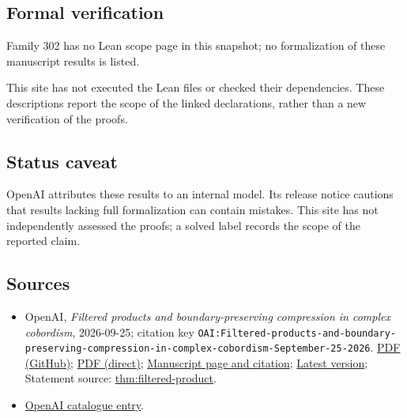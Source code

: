 \documentclass[11pt]{article}
\begin{document}
\subsection{Formal verification}
Family 302 has no Lean scope page in this snapshot; no formalization of these manuscript results is listed.

This site has not executed the Lean files or checked their dependencies. These descriptions report the scope of the linked declarations, rather than a new verification of the proofs.

\subsection{Status caveat}
OpenAI attributes these results to an internal model. Its release notice cautions that results lacking full formalization can contain mistakes. This site has not independently assessed the proofs; a solved label records the scope of the reported claim.

\subsection{Sources}
\begin{itemize}
\item OpenAI, \emph{Filtered products and boundary-preserving compression in complex cobordism}, 2026-09-25; citation key \texttt{OAI:Filtered-products-and-boundary-preserving-compression-in-complex-cobordism-September-25-2026}. \href{https://github.com/openai/math/blob/adc7f1241b42e322a6451854ab7e4b4c146bf78a/preprints/Filtered-products-and-boundary-preserving-compression-in-complex-cobordism-September-25-2026/paper.pdf}{PDF (GitHub)}; \href{https://github.com/openai/math/raw/adc7f1241b42e322a6451854ab7e4b4c146bf78a/preprints/Filtered-products-and-boundary-preserving-compression-in-complex-cobordism-September-25-2026/paper.pdf}{PDF (direct)}; \href{https://github.com/openai/math/blob/adc7f1241b42e322a6451854ab7e4b4c146bf78a/preprints/Filtered-products-and-boundary-preserving-compression-in-complex-cobordism-September-25-2026/README.md}{Manuscript page and citation}; \href{https://github.com/openai/math/blob/main/preprints/Filtered-products-and-boundary-preserving-compression-in-complex-cobordism-September-25-2026/paper.pdf}{Latest version}; Statement source: \href{https://github.com/openai/math/blob/adc7f1241b42e322a6451854ab7e4b4c146bf78a/preprints/Filtered-products-and-boundary-preserving-compression-in-complex-cobordism-September-25-2026/build/sections/01-introduction.tex\#L29}{thm:filtered-product}.
\item \href{https://github.com/openai/math/blob/adc7f1241b42e322a6451854ab7e4b4c146bf78a/CONTENTS.md}{OpenAI catalogue entry}.
\end{itemize}
\end{document}
